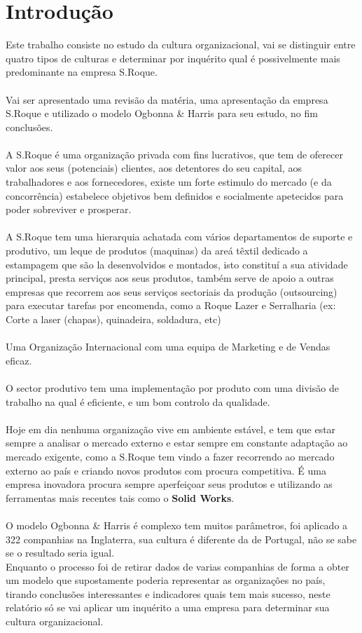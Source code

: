 \section{Introdução}
\qquad Este trabalho consiste no estudo da cultura organizacional, vai se distinguir entre quatro tipos de culturas e determinar por inquérito qual é possivelmente mais predominante na empresa S.Roque.\\
\\
Vai ser apresentado uma revisão da matéria, uma apresentação da empresa S.Roque e utilizado o modelo Ogbonna \& Harris para seu estudo, no fim conclusões.\\
\\
A S.Roque é uma organização privada com fins lucrativos, que tem de oferecer valor aos seus (potenciais) clientes, aos detentores do seu capital, aos trabalhadores e aos fornecedores, existe um forte estimulo do mercado (e da concorrência) estabelece objetivos bem definidos e socialmente apetecidos para poder sobreviver e prosperar.\cite{book_10}\\
\\
A S.Roque tem uma hierarquia achatada com vários departamentos de suporte e produtivo, um leque de produtos (maquinas) da areá têxtil dedicado a estampagem que são la desenvolvidos e montados, isto constituí a sua atividade principal, presta serviços aos seus produtos, também serve de apoio a outras empresas que recorrem aos seus serviços sectoriais da produção (outsourcing) para executar tarefas por encomenda, como a Roque Lazer e Serralharia (ex: Corte a laser (chapas), quinadeira, soldadura, etc)\\
\\
Uma Organização Internacional com uma equipa de Marketing e de Vendas eficaz.\\
\\
O sector produtivo tem uma implementação por produto com uma divisão de trabalho na qual é eficiente, e um bom controlo da qualidade.\\
\\
Hoje em dia nenhuma organização vive em ambiente estável, e tem que estar sempre a analisar o mercado externo e estar sempre em constante adaptação ao mercado exigente, como a S.Roque tem vindo a fazer recorrendo ao mercado externo ao país e criando novos produtos com procura competitiva. É uma empresa inovadora procura sempre aperfeiçoar seus produtos e utilizando as ferramentas mais recentes tais como o \textbf{Solid Works}.\\
\\
O modelo Ogbonna \& Harris é complexo tem muitos parâmetros, foi aplicado a 322 companhias na Inglaterra, sua cultura é diferente da de Portugal, não se sabe se o resultado seria igual.\\
Enquanto o processo foi de retirar dados de varias companhias de forma a obter um modelo que supostamente poderia representar as organizações no país, tirando conclusões interessantes e indicadores quais tem mais sucesso, neste relatório só se vai aplicar um inquérito a uma empresa para determinar sua cultura organizacional.
\newpage
